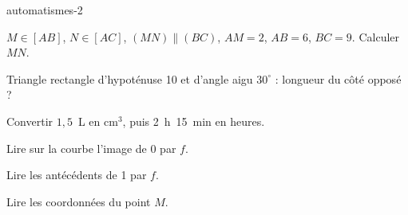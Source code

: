 \begin{blocEdition}{automatismes-2}
\begin{deuxcolonnes}
\begin{questions}
\item \begin{minipage}[t]{\linewidth}\raggedright\leavevmode $M\in[AB]$, $N\in[AC]$, $(MN)\parallel(BC)$, $AM=2$, $AB=6$, $BC=9$. Calculer $MN$.\end{minipage}
\item \begin{minipage}[t]{\linewidth}\raggedright\leavevmode Triangle rectangle d’hypoténuse 10 et d’angle aigu $30^\circ$ : longueur du côté opposé ?\end{minipage}
\item \begin{minipage}[t]{\linewidth}\raggedright\leavevmode Convertir $1{,}5$~L en cm$^3$, puis 2~h~15~min en heures.\end{minipage}
\end{questions}\end{deuxcolonnes}
\begin{deuxcolonnes}\begin{center}\par{}\end{center}
\begin{questions}
\item \begin{minipage}[t]{\linewidth}\raggedright\leavevmode Lire sur la courbe l’image de 0 par $f$.\end{minipage}
\item \begin{minipage}[t]{\linewidth}\raggedright\leavevmode Lire les antécédents de 1 par $f$.\end{minipage}
\item \begin{minipage}[t]{\linewidth}\raggedright\leavevmode Lire les coordonnées du point $M$.\end{minipage}

\end{questions}
\end{deuxcolonnes}
\end{blocEdition}
